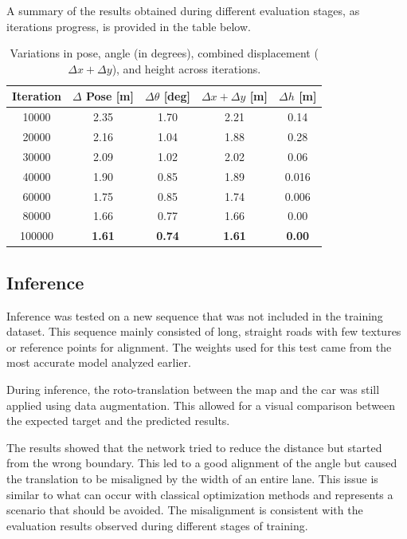 A summary of the results obtained during different evaluation stages, as iterations progress, is provided in the table below.

\begin{table}[H]
    \centering
    \renewcommand{\arraystretch}{1.2}
    \setlength{\tabcolsep}{10pt} 
    \begin{tabular}{c c c c c}
        \toprule
        \textbf{Iteration} & \textbf{$\Delta$ Pose [m]} & \textbf{$\Delta \theta$ [deg]} & \textbf{$\Delta x + \Delta y$ [m]} & \textbf{$\Delta h$ [m]} \\
        \midrule
        \num{10000}   & 2.35 & 1.70  & 2.21 & 0.14 \\
        \num{20000}   & 2.16 & 1.04  & 1.88 & 0.28 \\
        \num{30000}   & 2.09 & 1.02  & 2.02 & 0.06 \\
        \num{40000}   & 1.90 & 0.85  & 1.89 & 0.016 \\
        \num{60000}   & 1.75 & 0.85  & 1.74 & 0.006 \\
        \num{80000}   & 1.66 & 0.77  & 1.66 & 0.00 \\
        \num{100000}  & \textbf{1.61} & \textbf{0.74}  & \textbf{1.61} & \textbf{0.00} \\
        \bottomrule
    \end{tabular}
    \caption{Variations in pose, angle (in degrees), combined displacement ($\Delta x + \Delta y$), and height across iterations.}
    \label{tab:pose_variations_final_sumup}
\end{table}

\subsection{Inference}
Inference was tested on a new sequence that was not included in the training dataset. This sequence mainly consisted of long, straight roads with few textures or reference points for alignment. The weights used for this test came from the most accurate model analyzed earlier.

During inference, the roto-translation between the map and the car was still applied using data augmentation. This allowed for a visual comparison between the expected target and the predicted results.

The results showed that the network tried to reduce the distance but started from the wrong boundary. This led to a good alignment of the angle but caused the translation to be misaligned by the width of an entire lane. This issue is similar to what can occur with classical optimization methods and represents a scenario that should be avoided. The misalignment is consistent with the evaluation results observed during different stages of training.


